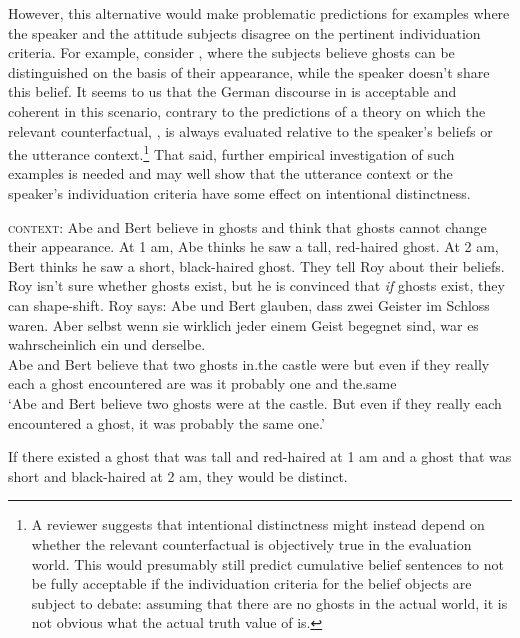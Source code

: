\documentclass[output=paper]{langscibook}
\begin{document}
\noindent However, this alternative would make problematic predictions for examples where the speaker and the attitude subjects disagree on the pertinent individuation criteria. For example, consider , where the subjects believe ghosts can be distinguished on the basis of their appearance, while the speaker doesn't share this belief. It seems to us that the German discourse in  is acceptable and coherent in this scenario, contrary to the predictions of a theory on which the relevant counterfactual, , is always evaluated relative to the speaker's beliefs or the utterance context.\footnote{A reviewer suggests that intentional distinctness might instead depend on whether the relevant counterfactual is objectively true in the evaluation world. This would presumably still predict cumulative belief sentences to not be fully acceptable if the individuation criteria for the belief objects are subject to debate: assuming that there are no ghosts in the actual world, it is not obvious what the actual truth value of  is.} That said, further empirical investigation of such examples is needed and may well show that the utterance context or the speaker's individuation criteria have some effect on intentional distinctness.

\eanoraggedright 
\eanoraggedright \label{sch-has:ex:rev5a}\textsc{context:} Abe and Bert believe in ghosts and think that ghosts cannot change their appearance. At 1 am, Abe thinks he saw a tall, red-haired ghost. At 2 am, Bert thinks he saw a short, black-haired ghost. They tell Roy about their beliefs. Roy isn't sure whether ghosts exist, but he is convinced that \textit{if} ghosts exist, they can shape-shift. Roy says:
\ex \label{sch-has:ex:rev5}
{\gll Abe und Bert glauben, dass zwei Geister im Schloss waren. Aber selbst wenn sie wirklich jeder einem Geist begegnet sind, war es wahrscheinlich ein und derselbe. \\
Abe and Bert believe that two ghosts in.the castle were but even if they really each a ghost encountered are was it probably one and the.same \\
\glt `Abe and Bert believe two ghosts were at the castle. But even if they really each encountered a ghost, it was probably the same one.'}  \z
 
\ex \label{sch-has:ex:rev5b}If there existed a ghost that was tall and red-haired at 1 am and a ghost that was short and black-haired at 2 am, they would be distinct.
\z %
\end{document}

